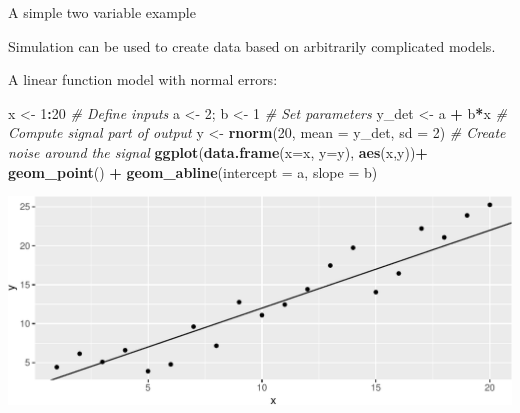 \documentclass[
  ignorenonframetext,
]{beamer}
\newenvironment{Shaded}{\begin{snugshade}}{\end{snugshade}}
\newcommand{\CommentTok}[1]{\textcolor[rgb]{0.56,0.35,0.01}{\textit{#1}}}
\newcommand{\DataTypeTok}[1]{\textcolor[rgb]{0.13,0.29,0.53}{#1}}
\newcommand{\DecValTok}[1]{\textcolor[rgb]{0.00,0.00,0.81}{#1}}
\newcommand{\KeywordTok}[1]{\textcolor[rgb]{0.13,0.29,0.53}{\textbf{#1}}}
\newcommand{\NormalTok}[1]{#1}
\newcommand{\OperatorTok}[1]{\textcolor[rgb]{0.81,0.36,0.00}{\textbf{#1}}}
\newcommand{\StringTok}[1]{\textcolor[rgb]{0.31,0.60,0.02}{#1}}
\begin{document}
\begin{frame}[fragile]{A simple two variable example}
\protect\hypertarget{a-simple-two-variable-example}{}

Simulation can be used to create data based on arbitrarily complicated
models.

A linear function model with normal errors:

\scriptsize

\begin{Shaded}
\begin{Highlighting}[]
\NormalTok{x <-}\StringTok{ }\DecValTok{1}\OperatorTok{:}\DecValTok{20} \CommentTok{# Define inputs}
\NormalTok{a <-}\StringTok{ }\DecValTok{2}\NormalTok{; b <-}\StringTok{ }\DecValTok{1} \CommentTok{# Set parameters}
\NormalTok{y_det <-}\StringTok{ }\NormalTok{a }\OperatorTok{+}\StringTok{ }\NormalTok{b}\OperatorTok{*}\NormalTok{x }\CommentTok{# Compute signal part of output}
\NormalTok{y <-}\StringTok{ }\KeywordTok{rnorm}\NormalTok{(}\DecValTok{20}\NormalTok{, }\DataTypeTok{mean =}\NormalTok{ y_det, }\DataTypeTok{sd =} \DecValTok{2}\NormalTok{) }\CommentTok{# Create noise around the signal}
\KeywordTok{ggplot}\NormalTok{(}\KeywordTok{data.frame}\NormalTok{(}\DataTypeTok{x=}\NormalTok{x, }\DataTypeTok{y=}\NormalTok{y), }\KeywordTok{aes}\NormalTok{(x,y))}\OperatorTok{+}
\StringTok{  }\KeywordTok{geom_point}\NormalTok{() }\OperatorTok{+}\StringTok{ }\KeywordTok{geom_abline}\NormalTok{(}\DataTypeTok{intercept =}\NormalTok{ a, }\DataTypeTok{slope =}\NormalTok{ b) }
\end{Highlighting}
\end{Shaded}

\includegraphics{simulation_files/figure-beamer/unnamed-chunk-9-1.pdf}

\end{frame}
\end{document}
